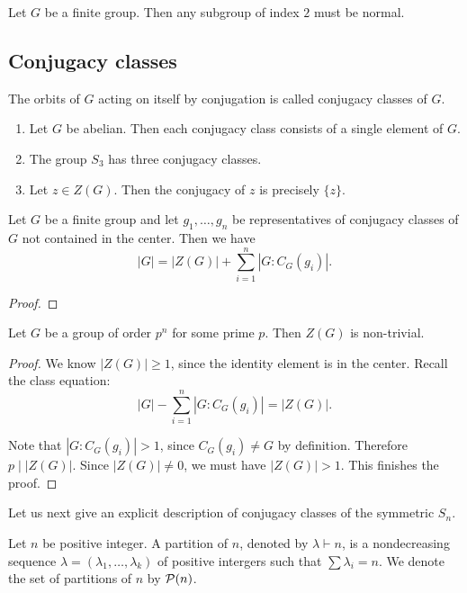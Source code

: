 \begin{cor}
    Let $G$ be a finite group. Then any subgroup of index $2$ must be normal.
\end{cor}


\subsection{Conjugacy classes}
\begin{defi}
    The orbits of $G$ acting on itself by conjugation is called conjugacy classes of $G$.
\end{defi}

\begin{example}
    \begin{enumerate}
        \item Let $G$ be abelian. Then each conjugacy class consists of a single element of $G$.
        \item The group $S_3$ has three conjugacy classes.
        \item Let $z \in Z(G)$. Then the conjugacy of $z$ is precisely $\{z\}$.
    \end{enumerate}
\end{example}


\begin{prop}
    Let $G$ be a finite group and let $g_1, \dots, g_n$ be representatives of conjugacy classes of $G$ not contained in the center. Then we have
    \[
        | G|  = |Z(G)| + \sum_{i=1}^n |G : C_{G}(g_i)|.
    \]
\end{prop}
\begin{proof}
\end{proof}
\begin{cor}
    Let $G$ be a group of order $p^n$ for some prime $p$. Then $Z(G)$ is non-trivial.
\end{cor}

\begin{proof}
    We know $|Z(G)| \ge 1$, since the identity element is in the center. Recall the class equation:
    \[
        | G| - \sum_{i=1}^n |G : C_{G}(g_i)| = |Z(G)|.
    \]

    Note that $|G : C_{G}(g_i)| > 1$, since $C_{G}(g_i) \neq G$ by definition. Therefore $p \mid |Z(G)|$. Since $|Z(G)| \neq 0$, we must have $|Z(G)| >1$. This finishes the proof.
\end{proof}

Let us next give an explicit description of conjugacy classes of the symmetric $S_n$.

\begin{defi}
    Let $n$ be positive integer. A partition of $n$, denoted by $\lambda  \vdash n$, is a nondecreasing sequence $\lambda = (\lambda_1, \dots, \lambda_k)$ of positive intergers such that $\sum \lambda_i = n$. We denote the set of partitions of $n$ by $\mathcal {P}(n)$.
\end{defi}

